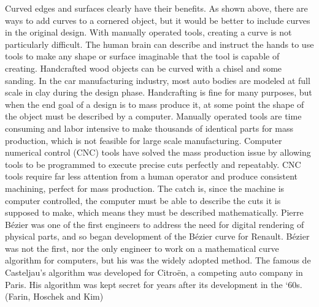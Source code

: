 \documentclass[12pt,letterpaper]{article}
\begin{document}
Curved edges and surfaces clearly have their benefits. As shown above, there are ways to add curves to a cornered object, but it would be better to include curves in the original design. With manually operated tools, creating a curve is not particularly difficult. The human brain can describe and instruct the hands to use tools to make any shape or surface imaginable that the tool is capable of creating. Handcrafted wood objects can be curved with a chisel and some sanding. In the car manufacturing industry, most auto bodies are modeled at full scale in clay during the design phase. Handcrafting is fine for many purposes, but when the end goal of a design is to mass produce it, at some point the shape of the object must be described by a computer. Manually operated tools are time consuming and labor intensive to make thousands of identical parts for mass production, which is not feasible for large scale manufacturing. Computer numerical control (CNC) tools have solved the mass production issue by allowing tools to be programmed to execute precise cuts perfectly and repeatably. CNC tools require far less attention from a human operator and produce consistent machining, perfect for mass production. The catch is, since the machine is computer controlled, the computer must be able to describe the cuts it is supposed to make, which means they must be described mathematically. Pierre B\'ezier was one of the first engineers to address the need for digital rendering of physical parts, and so began development of the B\'ezier curve for Renault. B\'ezier was not the first, nor the only engineer to work on a mathematical curve algorithm for computers, but his was the widely adopted method. The famous de Casteljau’s algorithm was developed for Citroën, a competing auto company in Paris. His algorithm was kept secret for years after its development in the ‘60s. (Farin, Hoschek and Kim)
\end{document}

